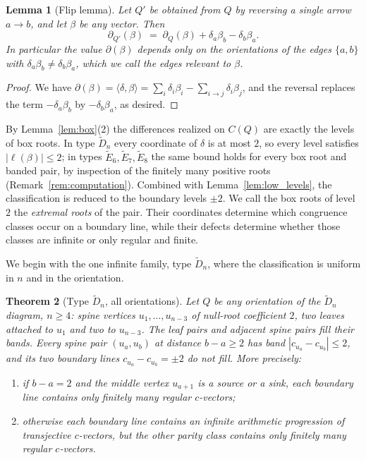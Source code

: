 \documentclass[11pt, a4paper]{amsart}
\newtheorem{theorem}{Theorem}[section]
\newtheorem{lemma}[theorem]{Lemma}
\theoremstyle{definition}
\begin{document}
\begin{lemma}[Flip lemma]
\label{lem:flip}
Let $Q'$ be obtained from $Q$ by reversing a single arrow $a \to b$, and
let $\beta$ be any vector. Then
\[
  \partial_{Q'}(\beta) \;=\; \partial_{Q}(\beta) + \delta_a \beta_b -
  \delta_b \beta_a.
\]
In particular the value $\partial(\beta)$ depends only on the orientations
of the edges $\{a, b\}$ with $\delta_a \beta_b \neq \delta_b \beta_a$,
which we call the edges \emph{relevant to} $\beta$.
\end{lemma}

\begin{proof}
We have $\partial(\beta) = \langle \delta, \beta \rangle = \sum_i \delta_i
\beta_i - \sum_{i \to j} \delta_i \beta_j$, and the reversal replaces the
term $-\delta_a \beta_b$ by $-\delta_b \beta_a$, as desired.
\end{proof}

By Lemma~\ref{lem:box}(2) the differences realized on $C(Q)$ are exactly
the levels of box roots. In
type $\widetilde{D}_n$ every coordinate of $\delta$ is at most $2$, so
every level satisfies $|\ell(\beta)| \leq 2$; in types $\widetilde{E}_6,
\widetilde{E}_7, \widetilde{E}_8$ the same bound holds for every box root
and banded pair, by inspection of the finitely many positive roots
(Remark~\ref{rem:computation}). Combined with Lemma~\ref{lem:low_levels},
the classification is reduced to the boundary levels $\pm2$. We call the
box roots of level $2$ the \emph{extremal roots} of the pair. Their
coordinates determine which congruence classes occur on a boundary line,
while their defects determine whether those classes are infinite or only
regular and finite.

We begin with the one infinite family, type $\widetilde{D}_n$, where the
classification is uniform in $n$ and in the orientation.

\begin{theorem}[Type $\widetilde{D}_n$, all orientations]
\label{thm:Dtilde_classification}
Let $Q$ be any orientation of the $\widetilde{D}_n$ diagram, $n \geq 4$:
spine vertices $u_1, \dots, u_{n-3}$ of null-root coefficient $2$, two
leaves attached to $u_1$ and two to $u_{n-3}$. The leaf pairs and adjacent
spine pairs fill their bands. Every spine pair $(u_a,u_b)$ at distance
$b-a\geq2$ has band $|c_{u_a}-c_{u_b}|\leq2$, and its two boundary lines
$c_{u_a}-c_{u_b}=\pm2$ do not fill. More precisely:
\begin{enumerate}[label=\textup{(\arabic*)}]
\item if $b-a=2$ and the middle vertex $u_{a+1}$ is a source or a sink,
  each boundary line contains only finitely many regular $c$-vectors;
\item otherwise each boundary line contains an infinite arithmetic
  progression of transjective $c$-vectors, but the other parity class
  contains only finitely many regular $c$-vectors.
\end{enumerate}
\end{theorem}
\end{document}
